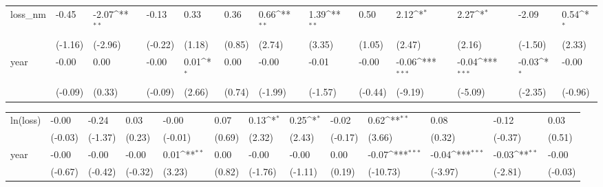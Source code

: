 \def\sym#1{\ifmmode^{#1}\else\(^{#1}\)\fi}
\begin{tabular}{p{1.5cm} p{1.7cm} p{1.7cm} p{1.7cm}  p{1.7cm} p{1.7cm} p{1.7cm} p{1.7cm} p{1.7cm}  p{1.7cm} p{1.7cm} p{1.7cm} p{1.7cm} }
\hline
loss\_nm         &    -0.45         &    -2.07\sym{**} &    -0.13         &     0.33         &     0.36         &     0.66\sym{**} &     1.39\sym{**} &     0.50         &     2.12\sym{*}  &     2.27\sym{*}  &    -2.09         &     0.54\sym{*}  \\
                &  (-1.16)         &  (-2.96)         &  (-0.22)         &   (1.18)         &   (0.85)         &   (2.74)         &   (3.35)         &   (1.05)         &   (2.47)         &   (2.16)         &  (-1.50)         &   (2.33)         \\
year            &    -0.00         &     0.00         &    -0.00         &     0.01\sym{*}  &     0.00         &    -0.00         &    -0.01         &    -0.00         &    -0.06\sym{***}&    -0.04\sym{***}&    -0.03\sym{*}  &    -0.00         \\
                &  (-0.09)         &   (0.33)         &  (-0.09)         &   (2.66)         &   (0.74)         &  (-1.99)         &  (-1.57)         &  (-0.44)         &  (-9.19)         &  (-5.09)         &  (-2.35)         &  (-0.96)         \\
\end{tabular}
\def\sym#1{\ifmmode^{#1}\else\(^{#1}\)\fi}
\begin{tabular}{p{1.5cm} p{1.7cm} p{1.7cm} p{1.7cm}  p{1.7cm} p{1.7cm} p{1.7cm} p{1.7cm} p{1.7cm}  p{1.7cm} p{1.7cm} p{1.7cm} p{1.7cm} }
\hline
ln(loss)        &    -0.00         &    -0.24         &     0.03         &    -0.00         &     0.07         &     0.13\sym{*}  &     0.25\sym{*}  &    -0.02         &     0.62\sym{**} &     0.08         &    -0.12         &     0.03         \\
                &  (-0.03)         &  (-1.37)         &   (0.23)         &  (-0.01)         &   (0.69)         &   (2.32)         &   (2.43)         &  (-0.17)         &   (3.66)         &   (0.32)         &  (-0.37)         &   (0.51)         \\
year            &    -0.00         &    -0.00         &    -0.00         &     0.01\sym{**} &     0.00         &    -0.00         &    -0.00         &     0.00         &    -0.07\sym{***}&    -0.04\sym{***}&    -0.03\sym{**} &    -0.00         \\
                &  (-0.67)         &  (-0.42)         &  (-0.32)         &   (3.23)         &   (0.82)         &  (-1.76)         &  (-1.11)         &   (0.19)         & (-10.73)         &  (-3.97)         &  (-2.81)         &  (-0.03)         \\
\end{tabular}
